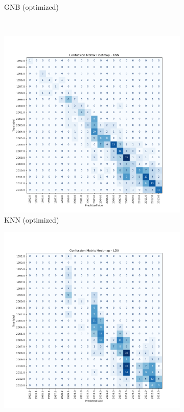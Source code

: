 \documentclass[conference,onecolumn]{IEEEtran}
\begin{document}
\begin{figure}[htbp]
\begin{subfigure}{0.4\textwidth}
		\caption{GNB (optimized)}
		\label{appx:cmheatmapgnb}
    \end{subfigure}\\
    \begin{subfigure}{0.4\textwidth}
        \centering
		\includegraphics[width=\linewidth]{Plots/CM_Heatmap_KNN.png}
		\caption{KNN (optimized)}
		\label{appx:cmheatmapknn}
    \end{subfigure}%
    \begin{subfigure}{0.4\textwidth}
        \centering
		\includegraphics[width=\linewidth]{Plots/CM_Heatmap_LDA.png}

\end{subfigure}
\end{figure}
\end{document}
